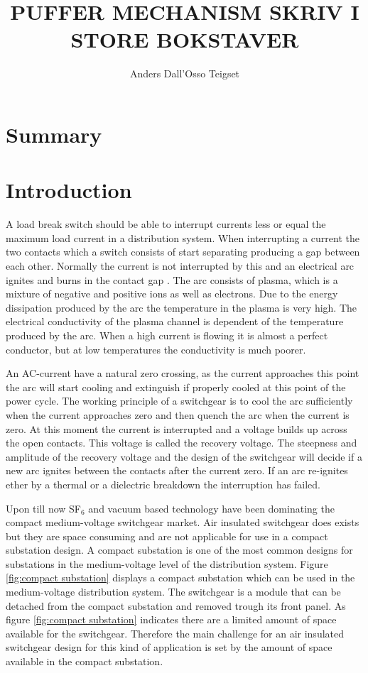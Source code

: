 \documentclass[10pt,a4paper]{article} %
\author{Anders Dall'Osso Teigset}
\title{PUFFER MECHANISM SKRIV I STORE BOKSTAVER}
\begin{document}
\maketitle
\newpage
\section*{Summary}
\newpage
\tableofcontents
\newpage
\section{Introduction}
A load break switch should be able to interrupt currents less or equal the maximum load current in a distribution system. When interrupting a current the two contacts which a switch consists of start separating producing a gap between each other. Normally the current is not interrupted by this and an electrical arc ignites and burns in the contact gap \cite{bib:HVEbreak}. The arc consists of plasma, which is a mixture of negative and positive ions as well as electrons. Due to the energy dissipation produced by the arc the temperature in the plasma is very high. The electrical conductivity of the plasma channel is dependent of the temperature produced by the arc. When a high current is flowing it is almost a perfect conductor, but at low temperatures the conductivity is much poorer.

An AC-current have a natural zero crossing, as the current approaches this point the arc will start cooling and extinguish if properly cooled at this point of the power cycle. The working principle of a switchgear is to cool the arc sufficiently when the current approaches zero and then quench the arc when the current is zero. At this moment the current is interrupted and a voltage builds up across the open contacts. This voltage is called the recovery voltage. The steepness and amplitude of the recovery voltage \cite{bib:HVEbreak} and the design of the switchgear will decide if a new arc ignites between the contacts after the current zero. If an arc re-ignites ether by a thermal or a dielectric breakdown the interruption has failed. 

Upon till now SF$_6$ and vacuum based technology have been dominating the compact medium-voltage switchgear market. Air insulated switchgear does exists but they are space consuming and are not applicable for use in a compact substation design. A compact substation is one of the most common designs for substations in the medium-voltage level of the distribution system. Figure \ref{fig:compact substation} displays a compact substation which can be used in the medium-voltage distribution system. The switchgear is a module that can be detached from the compact substation and removed trough its front panel. As figure \ref{fig:compact substation} indicates there are a limited amount of space available for the switchgear. Therefore the main challenge for an air insulated switchgear design for this kind of application is set by the amount of space available in the compact substation.
\end{document}
